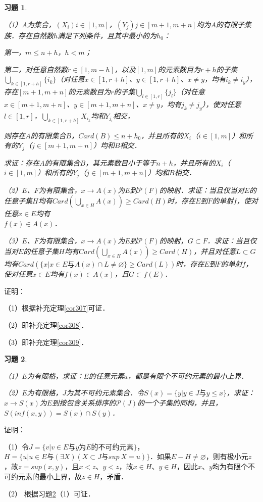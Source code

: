 \documentclass[12pt, a4paper, oneside]{book}
\newtheorem{exer}{习题}
\begin{document}
			\begin{exer}\label{exer132}
				\hfill\par
				（1）$A$为集合，$(X_i)i\in [1, m]$，$(Y_j)j\in [m+1, m+n]$均为$A$的有限子集族．存在自然数$h$满足下列条件，且其中最小的为$h_0$：
				\par
				第一，$m\leq n+h$，$h<m$；
				\par
				第二，对任意自然数$r\in [1, m-h]$，以及$[1, m]$的元素数目为$r+h$的子集$\bigcup\limits_{k\in [1, r+h]}\{i_k\}$（对任意$x\in [1, r+h]$、$y \in [1, r+h]$、$x\neq y$，均有$i_k\neq i_y$），存在$[m+1, m+n]$的元素数目为$r$的子集$\bigcup\limits_{l\in [1, r]}\{j_l\}$（对任意$x\in [m+1, m+n]$、$y \in [m+1, m+n]$、$x\neq y$，均有$j_k\neq j_y$），使对任意$l\in [1, r]$，$\bigcup\limits_{k\in [1, r+h]}X_{i_k}$均和$Y_{j_l}$相交，
				\par
				则存在$A$的有限集合$B$，$Card(B)\leq n+h_0$，并且所有的$X_i$（$i\in [1, m]$）和所有的$Y_j$（$j\in [m+1, m+n]$）均和$B$相交．
				\par
				求证：存在$A$的有限集合$B$，其元素数目小于等于$n+h$，并且所有的$X_i$（$i\in [1, m]$）和所有的$Y_j$（$j\in [m+1, m+n]$）均和$B$相交．
				\par
				（2）$E$、$F$为有限集合，$x\to A(x)$为$E$到$\mathcal{P}(F)$的映射．求证：当且仅当对$E$的任意子集$H$均有$Card(\bigcup\limits_{x\in H}A(x))\geq Card(H)$时，存在$E$到$F$的单射$f$，使对任意$x\in E$均有\\$f(x)\in A(x)$．
				\par
				（3）$E$、$F$为有限集合，$x\to A(x)$为$E$到$\mathcal{P}(F)$的映射，$G\subset F$．求证：当且仅当对$E$的任意子集$H$均有$Card(\bigcup\limits_{x\in H}A(x))\geq Card(H)$，并且对任意$L\subset G$均有$Card(\{x|x\in E\text{与}A(x)\cap L\neq \varnothing\}\geq Card(L))$时，存在$E$到$F$的单射$f$，使对任意$x\in E$均有$f(x)\in A(x)$，且$G\subset f(E)$．
			\end{exer}
			证明：
			\par
			（1）根据补充定理\ref{cor307}可证．
			\par
			（2）即补充定理\ref{cor308}．
			\par
			（3）即补充定理\ref{cor309}．
			
			\begin{exer}\label{exer133}
				\hfill\par
				（1）$E$为有限格，求证：$E$的任意元素$a$，都是有限个不可约元素的最小上界．
				\par
				（2）$E$为有限格，$J$为其不可约元素集合．令$S(x)=\{y|y\in J\text{与}y\leq x\}$，求证：$x\to S(x)$为$E$到按包含关系排序的$\mathcal{P}(J)$的一个子集的同构，并且，$S(inf(x, y))=S(x)\cap S(y)$．
			\end{exer}
			证明：
			\par
			（1）令$J=\{v|v\in E\text{与}y\text{为}E\text{的不可约元素}\}$，$H=\{u|u\in E\text{与}(\exists X)(X\subset J\text{与}sup\ X=u)\}$．如果$E-H\neq \varnothing$，则有极小元$z$，故$z=sup(x, y)$，且$x<z$、$y<z$，故$x\in H$、$y\in H$，因此$x$、$y$均为有限个不可约元素的最小上界，故$z\in H$，矛盾．
			\par
			（2）	根据习题\ref{exer133}（1）可证．
			
\end{document}
